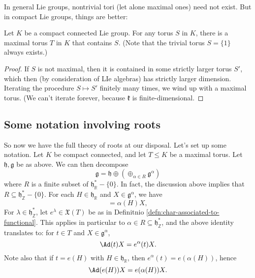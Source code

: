 \documentclass[reqno]{amsart} 
\begin{document}
In general Lie groups, nontrivial tori (let alone maximal ones) need not exist.  But in compact Lie groups, things are better:
\begin{lemma}
  Let $K$ be a compact connected Lie group.  For any torus $S$ in $K$, there is a maximal torus $T$ in $K$ that contains $S$.  (Note that the trivial torus $S = \{1\}$ always exists.)
\end{lemma}
\begin{proof}
  If $S$ is not maximal, then it is contained in some strictly larger torus $S'$, which then (by consideration of LIe algebras) has strictly larger dimension.  Iterating the procedure $S \mapsto S'$ finitely many times, we wind up with a maximal torus.  (We can't iterate forever, because $\mathfrak{k}$ is finite-dimensional.
\end{proof}

\subsection{Some notation involving roots\label{sec:notationinvolvingroots-for-amxl-tori-section}}
\label{sec:org822bc0f}
So now we have the full theory of roots at our disposal.  Let's set up some notation.  Let $K$ be compact connected, and let $T \leq K$ be a maximal torus.  Let $\mathfrak{h},\mathfrak{g}$ be as above.  We can then decompose
\begin{equation}\label{eq:root-space-decmop-for-compact-LIe-group-amxiaml-trous}
  \mathfrak{g} = \mathfrak{h} \oplus (\oplus_{\alpha \in R} \mathfrak{g}^\alpha)
\end{equation}
where $R$ is a finite subset of $\mathfrak{h}_\mathbb{R}^* - \{0\}$.  In fact, the discussion above implies that $R \subseteq \mathfrak{h}_\mathbb{Z}^* - \{0\}$.  For each $H \in \mathfrak{h}_\mathbb{R}$ and $X \in \mathfrak{g}^\alpha$, we have
\begin{equation*}
 [H,X] = \alpha(H) X,
\end{equation*}
For $\lambda \in \mathfrak{h}_\mathbb{Z}^*$, let $e^\lambda \in \mathfrak{X}(T)$ be as in Definitnio \ref{defn:char-associated-to-functional}.  This applies in particular to $\alpha \in R \subseteq \mathfrak{h}_\mathbb{Z}^*$, and the above identity translates to: for $t \in T$ and $X \in \mathfrak{g}^\alpha$,
\begin{equation}\label{eq:}
  \Ad(t) X = e^\alpha (t) X.
\end{equation}
Note also that if $t = e(H)$ with $H \in \mathfrak{h}_\mathbb{R}$, then $e^\alpha (t) = e(\alpha(H))$, hence
\begin{equation}\label{eq:how-ad-e-H-acts-on-X}
  \Ad(e(H)) X = e(\alpha(H)) X.
\end{equation}
\end{document}
